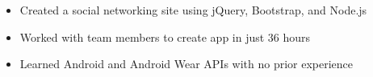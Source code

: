\documentclass[10pt]{article}
\begin{document}

	\begin{itemize}[noitemsep,topsep=0.25em]
		\item Created a social networking site using jQuery, Bootstrap, and Node.js
	\end{itemize}


	\begin{itemize}[noitemsep,topsep=0.25em]
		\item Worked with team members to create app in just 36 hours
		\item Learned Android and Android Wear APIs with no prior experience
	\end{itemize}
\end{document}
